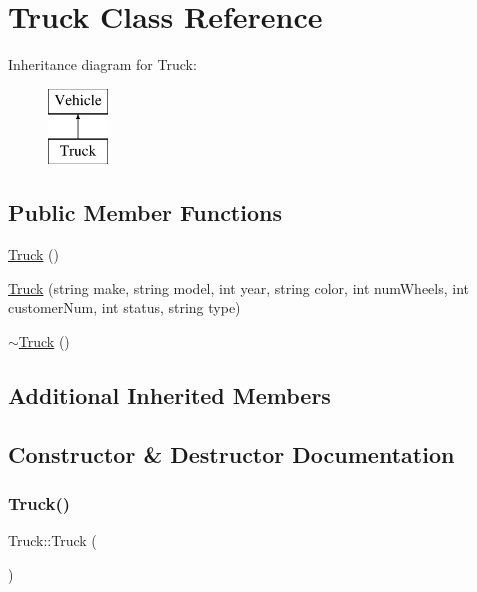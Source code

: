\hypertarget{class_truck}{}\section{Truck Class Reference}
\label{class_truck}
Inheritance diagram for Truck\+:\begin{figure}[H]
\begin{center}
\leavevmode
\includegraphics[height=2.000000cm]{class_truck}
\end{center}
\end{figure}
\subsection*{Public Member Functions}
\begin{DoxyCompactItemize}
\item 
\hyperlink{class_truck_a87e358bca8fe34e6299c6ff233afb08b}{Truck} ()
\item 
\hyperlink{class_truck_a134acf4a22664f65be38ba2843b2ae18}{Truck} (string make, string model, int year, string color, int num\+Wheels, int customer\+Num, int status, string type)
\item 
\hyperlink{class_truck_afe887186d0490451a8ce4a3ef433dee3}{$\sim$\+Truck} ()
\end{DoxyCompactItemize}
\subsection*{Additional Inherited Members}


\subsection{Constructor \& Destructor Documentation}
\mbox{\label{class_truck_a87e358bca8fe34e6299c6ff233afb08b}} 
\subsubsection{\texorpdfstring{Truck()}{Truck()}\hspace{0.1cm}{\footnotesize\ttfamily [1/2]}}
{\footnotesize\ttfamily Truck\+::\+Truck (\begin{DoxyParamCaption}{ }\end{DoxyParamCaption})}

